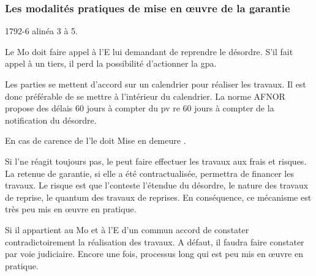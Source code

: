 			\subsubsection{Les modalités pratiques de mise en œuvre de la garantie}

				1792-6 alinéa 3 à 5.

				Le Mo doit faire appel à l'E lui demandant de reprendre le désordre. S'il fait appel à un tiers, il perd la possibilité d'actionner la gpa.

				Les parties se mettent d'accord sur un calendrier pour réaliser les travaux. Il est donc préférable de se mettre à l'intérieur du calendrier. La norme AFNOR propose des délais 60 jours à compter du pv re
				60 jours à compter de la notification du désordre.

				En cas de carence de l'\E le \Mo doit Mise en demeure .

				Si l'\E ne réagit toujours pas, le \Mo peut faire effectuer les travaux aux frais et risques. La retenue de garantie, si elle a été contractualisée, permettra de financer les travaux. Le risque est que l'\E conteste l'étendue du désordre, le nature des travaux de reprise, le quantum des travaux de reprises. En conséquence, ce mécanisme est très peu mis en œuvre en pratique.

				Si il appartient au Mo et à l'E d'un commun accord de constater contradictoirement la réalisation des travaux. A défaut, il faudra faire constater par voie judiciaire. Encore une fois, processus long qui est peu mis en œuvre en pratique.

